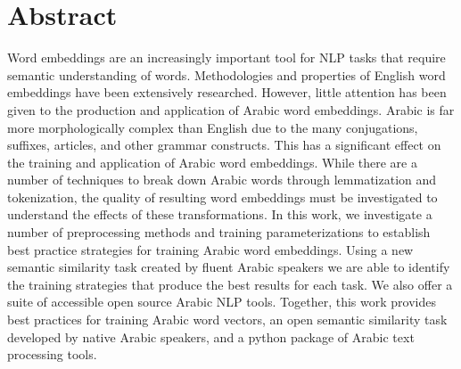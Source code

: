 \section*{Abstract}

Word embeddings are an increasingly important tool for NLP tasks that require semantic understanding of words. Methodologies and properties of English word embeddings have been extensively researched. However, little attention has been given to the production and application of Arabic word embeddings. Arabic is far more morphologically complex than English due to the many conjugations, suffixes, articles, and other grammar constructs. This has a significant effect on the training and application of Arabic word embeddings. While there are a number of techniques to break down Arabic words through lemmatization and tokenization, the quality of resulting word embeddings must be investigated to understand the effects of these transformations. In this work, we investigate a number of preprocessing methods and training parameterizations to establish best practice strategies for training Arabic word embeddings. Using a new semantic similarity task created by fluent Arabic speakers we are able to identify the training strategies that produce the best results for each task. We also offer a suite of accessible open source Arabic NLP tools. Together, this work provides best practices for training Arabic word vectors, an open semantic similarity task developed by native Arabic speakers, and a python package of Arabic text processing tools.